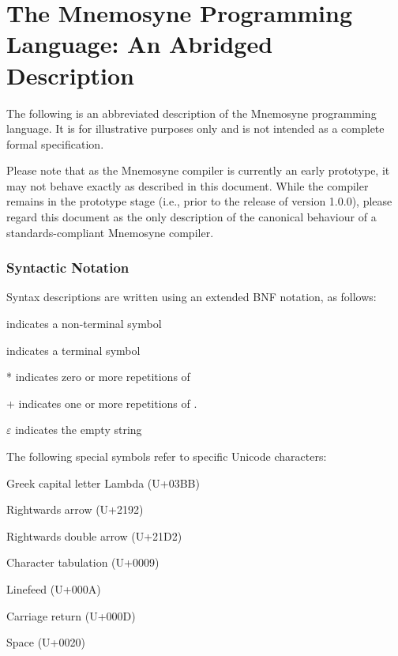 %

\chapter{The Mnemosyne Programming Language: An Abridged Description}\label{app:spec}
\setlength{\grammarindent}{6em}

The following is an abbreviated description of the Mnemosyne programming language. It is for illustrative purposes only and is not intended as a complete formal specification.

Please note that as the Mnemosyne compiler is currently an early prototype, it may not behave exactly as described in this document. While the compiler remains in the prototype stage (i.e., prior to the release of version 1.0.0), please regard this document as the only description of the canonical behaviour of a standards-compliant Mnemosyne compiler.

\subsection{Syntactic Notation}
Syntax descriptions are written using an extended BNF notation, as follows:
\begin{description}[leftmargin=3cm,labelindent=\parindent]
    \item{} indicates a non-terminal symbol
    \item{} indicates a terminal symbol
    \item{* } indicates zero or more repetitions of 
    \item{+} indicates one or more repetitions of .
    \item{$\varepsilon$} indicates the empty string
\end{description}

The following special symbols refer to specific Unicode characters:
\begin{description}[leftmargin=3cm,labelindent=\parindent]
    \item{} Greek capital letter Lambda (U+03BB)
    \item{} Rightwards arrow (U+2192)
    \item{} Rightwards double arrow (U+21D2)
    \item{} Character tabulation (U+0009)
    \item{} Linefeed (U+000A)
    \item{} Carriage return (U+000D)
    \item{} Space (U+0020)
\end{description}


